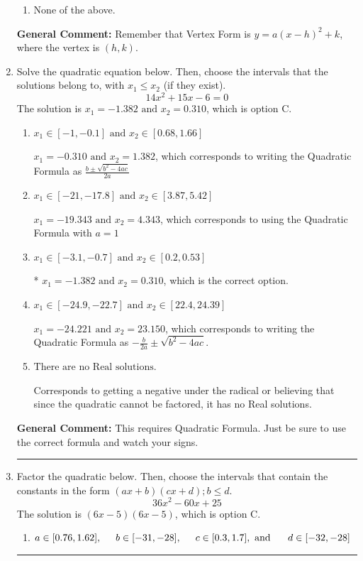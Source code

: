 \documentclass{extbook}[14pt]
\newcommand{\litem}[1]{\item #1

\rule{\textwidth}{0.4pt}}
\begin{document}
\begin{enumerate}
{\begin{enumerate}[label=\Alph*.]
\begin{multicols}{2}
\end{multicols}\item None of the above.\end{enumerate}
\textbf{General Comment:} Remember that Vertex Form is $y = a(x-h)^2+k$, where the vertex is $(h, k)$.
}
\litem{
Solve the quadratic equation below. Then, choose the intervals that the solutions belong to, with $x_1 \leq x_2$ (if they exist).
\[ 14x^{2} +15 x -6 = 0 \]The solution is \( x_1 = -1.382 \text{ and } x_2 = 0.310 \), which is option C.\begin{enumerate}[label=\Alph*.]
\item \( x_1 \in [-1, -0.1] \text{ and } x_2 \in [0.68, 1.66] \)

 $x_1 = -0.310 \text{ and } x_2 = 1.382$, which corresponds to writing the Quadratic Formula as $\frac{b \pm \sqrt{b^2 - 4ac}}{2a}$
\item \( x_1 \in [-21, -17.8] \text{ and } x_2 \in [3.87, 5.42] \)

 $x_1 = -19.343 \text{ and } x_2 = 4.343$, which corresponds to using the Quadratic Formula with $a=1$
\item \( x_1 \in [-3.1, -0.7] \text{ and } x_2 \in [0.2, 0.53] \)

* $x_1 = -1.382 \text{ and } x_2 = 0.310$, which is the correct option.
\item \( x_1 \in [-24.9, -22.7] \text{ and } x_2 \in [22.4, 24.39] \)

 $x_1 = -24.221 \text{ and } x_2 = 23.150$, which corresponds to writing the Quadratic Formula as $-\frac{b}{2a} \pm \sqrt{b^2 - 4ac}$.
\item \( \text{There are no Real solutions.} \)

Corresponds to getting a negative under the radical or believing that since the quadratic cannot be factored, it has no Real solutions.
\end{enumerate}

\textbf{General Comment:} This requires Quadratic Formula. Just be sure to use the correct formula and watch your signs.
}
\litem{
Factor the quadratic below. Then, choose the intervals that contain the constants in the form $(ax+b)(cx+d); b \leq d.$
\[ 36x^{2} -60 x + 25 \]The solution is \( (6x -5)(6x -5) \), which is option C.\begin{enumerate}[label=\Alph*.]
\item \( a \in [0.76, 1.62], \hspace*{5mm} b \in [-31, -28], \hspace*{5mm} c \in [0.3, 1.7], \text{ and } \hspace*{5mm} d \in [-32, -28] \)


\end{enumerate}}
\end{enumerate}
\end{document}

